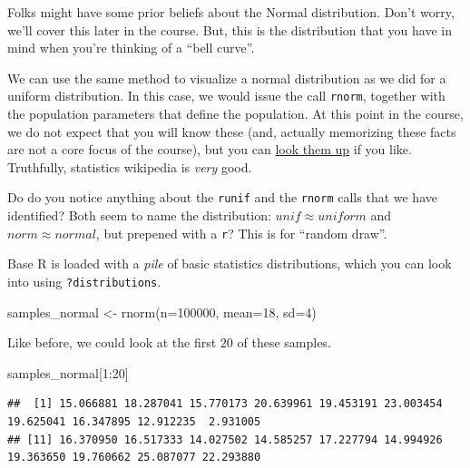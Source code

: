 \documentclass[
]{book}
\newenvironment{Shaded}{\begin{snugshade}}{\end{snugshade}}
\newcommand{\AttributeTok}[1]{\textcolor[rgb]{0.77,0.63,0.00}{#1}}
\newcommand{\DecValTok}[1]{\textcolor[rgb]{0.00,0.00,0.81}{#1}}
\newcommand{\FunctionTok}[1]{\textcolor[rgb]{0.00,0.00,0.00}{#1}}
\newcommand{\NormalTok}[1]{#1}
\newcommand{\OtherTok}[1]{\textcolor[rgb]{0.56,0.35,0.01}{#1}}
\newcommand{\SpecialCharTok}[1]{\textcolor[rgb]{0.00,0.00,0.00}{#1}}
\theoremstyle{definition}
\theoremstyle{definition}
\theoremstyle{definition}
\theoremstyle{definition}
\theoremstyle{remark}
\begin{document}
Folks might have some prior beliefs about the Normal distribution. Don't worry, we'll cover this later in the course. But, this is the distribution that you have in mind when you're thinking of a ``bell curve''.

We can use the same method to visualize a normal distribution as we did for a uniform distribution. In this case, we would issue the call \texttt{rnorm}, together with the population parameters that define the population. At this point in the course, we do not expect that you will know these (and, actually memorizing these facts are not a core focus of the course), but you can \href{https://en.wikipedia.org/wiki/Normal_distribution}{look them up} if you like. Truthfully, statistics wikipedia is \emph{very} good.

Do do you notice anything about the \texttt{runif} and the \texttt{rnorm} calls that we have identified? Both seem to name the distribution: \(unif \approx uniform\) and \(norm \approx normal\), but prepened with a \texttt{r}? This is for ``random draw''.

Base R is loaded with a \emph{pile} of basic statistics distributions, which you can look into using \texttt{?distributions}.

\begin{Shaded}
\begin{Highlighting}[]
\NormalTok{samples\_normal }\OtherTok{\textless{}{-}} \FunctionTok{rnorm}\NormalTok{(}\AttributeTok{n=}\DecValTok{100000}\NormalTok{, }\AttributeTok{mean=}\DecValTok{18}\NormalTok{, }\AttributeTok{sd=}\DecValTok{4}\NormalTok{)}
\end{Highlighting}
\end{Shaded}

Like before, we could look at the first \(20\) of these samples.

\begin{Shaded}
\begin{Highlighting}[]
\NormalTok{samples\_normal[}\DecValTok{1}\SpecialCharTok{:}\DecValTok{20}\NormalTok{]}
\end{Highlighting}
\end{Shaded}

\begin{verbatim}
##  [1] 15.066881 18.287041 15.770173 20.639961 19.453191 23.003454 19.625041 16.347895 12.912235  2.931005
## [11] 16.370950 16.517333 14.027502 14.585257 17.227794 14.994926 19.363650 19.760662 25.087077 22.293880
\end{verbatim}
\end{document}
